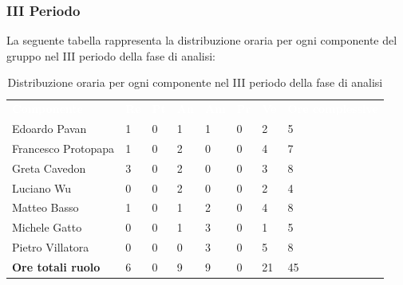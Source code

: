 \subsubsection{III Periodo}
La seguente tabella rappresenta la distribuzione oraria per ogni componente del gruppo nel III periodo della fase di analisi:
\begin{table}[H]
\begin{center}
\renewcommand{\arraystretch}{1.25}
\begin{tabular}{ m{}<{\centering}  m{}<{\centering} m{}<{\centering} m{}<{\centering}  m{}<{\centering}  m{}<{\centering}  m{}<{\centering}  m{}<{\centering}   }
	\rowcolor{darkblue}
	\textcolor{white}{\textbf{Componente}} &\textcolor{white}{\textbf{Re}}&\textcolor{white}{\textbf{Pt}}&\textcolor{white}{\textbf{An}}&\textcolor{white}{\textbf{Am}}&\textcolor{white}{\textbf{Pr}}&\textcolor{white}{\textbf{Ve}}&\textcolor{white}{\textbf{Ore complessive}}\\ 
	Edoardo Pavan & 1 & 0 & 1 & 1 & 0 & 2 & 5 \\	
	
	Francesco Protopapa & 1 & 0 & 2 & 0 & 0 & 4 & 7 \\

	Greta Cavedon & 3 & 0 & 2 & 0 & 0 & 3 & 8 \\
	
	Luciano Wu & 0 & 0 & 2 & 0 & 0 & 2 & 4 \\
	
	Matteo Basso & 1 & 0 & 1 & 2 & 0 & 4 & 8 \\
	
	Michele Gatto &  0 & 0 & 1 & 3 & 0 & 1 & 5 \\
	
	Pietro Villatora & 0 & 0 & 0 & 3 & 0 & 5 & 8 \\
	
	\textbf{Ore totali ruolo} & 6 & 0 & 9 & 9 & 0 & 21 & 45\\

\end{tabular}
\caption{Distribuzione oraria per ogni componente nel III periodo della fase di analisi}
\end{center}
\end{table}

